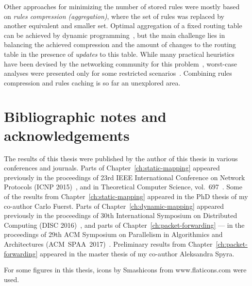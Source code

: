 Other approaches for minimizing the number of stored rules were mostly based
on \emph{rules compression (aggregation)}, where the set of rules was replaced
by another equivalent and smaller set. Optimal aggregation of a fixed routing
table can be achieved by dynamic
programming~\cite{ortc,fib-compression-two-dimensional}, but the main
challenge lies in balancing the achieved compression and the amount of changes
to the routing table in the presence of \emph{updates} to this table. While
many practical heuristics have been devised by the networking community for
this problem~\cite{mms,fib-compression-fifa,fib-compression-globecom10,fib-compression-infocom13,fib-sigcomm,fib-compression-smalta,fib-compression-infocom10},
worst-case analyses were presented only for some restricted
scenarios~\cite{fib-icdcs,fib-sirocco}. Combining rules compression and rules
caching is so far an unexplored area.



\section{Bibliographic notes and acknowledgements}

The results of this thesis were published by the author of this thesis in various conferences and journals.
Parts of Chapter~\ref{ch:static-mapping} appeared previously in the proceedings of 23rd IEEE International Conference on Network Protocols (ICNP 2015)~\cite{my-icnp},
and in Theoretical Computer Science, vol.~697~\cite{my-tcs}.
Some of the results from Chapter~\ref{ch:static-mapping} appeared in the PhD thesis of my co-author Carlo Fuerst.
Parts of Chapter~\ref{ch:dynamic-mapping} appeared previously in the proceedings of 30th International Symposium on Distributed Computing (DISC 2016)~\cite{my-disc}, and parts of Chapter~\ref{ch:packet-forwarding} --- in the proceedings of 29th ACM Symposium on Parallelism in Algorithmics and Architectures (ACM~SPAA~2017)~\cite{my-spaa}.
Preliminary results from Chapter~\ref{ch:packet-forwarding} appeared in the master thesis of my co-author Aleksandra Spyra.

For some figures in this thesis, icons by Smashicons from www.flaticons.com were used.